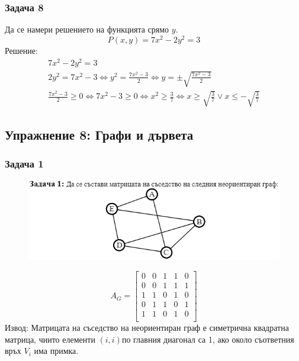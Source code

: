 \documentclass[fleqn, 12pt]{article}
\theoremstyle{definition}
\begin{document}
\subsubsection*{Задача 8}
Да се намери решението на функцията срямо $y$. 
$$P(x,y) = 7x^2 - 2y^2 = 3$$
Решение: 
\begin{gather*}
7x^2 - 2y^2 = 3\\
2y^2 = 7x^2 - 3 \Leftrightarrow y^2 = \frac{7x^2 - 3}{2} \Leftrightarrow y = \pm \sqrt{\frac{7x^2 - 3}{2}} \\
\frac{7x^2 - 3}{2} \geq 0 \Leftrightarrow 7x^2 - 3 \geq 0 \Leftrightarrow x^2 \geq \frac{3}{7} \Leftrightarrow x \geq \sqrt{\frac{3}{7}} \lor x \leq - \sqrt{\frac{3}{7}}
\end{gather*}
\newpage
\subsection{Упражнение 8: Графи и дървета}

\subsubsection*{Задача 1}
\begin{figure} [htp!]
\includegraphics[width = \linewidth]{Pics/Discrete math/ex8/ex8-task1.png}
\end{figure}
$$A_G = 
\begin{bmatrix}
0 & 0 & 1 & 1 & 0 \\
0 & 0 & 1 & 1 & 1 \\
1 & 1 & 0 & 1 & 0 \\
0 & 1 & 1 & 0 & 1 \\
1 & 1 & 0 & 1 & 0 \\
\end{bmatrix}
$$
Извод: Матрицата на съседство на неориентиран граф е симетрична квадратна матрица, чиито елементи $(i,i)$по главния диагонал са 1, ако около съответния връх $V_i$ има примка.
\end{document}
